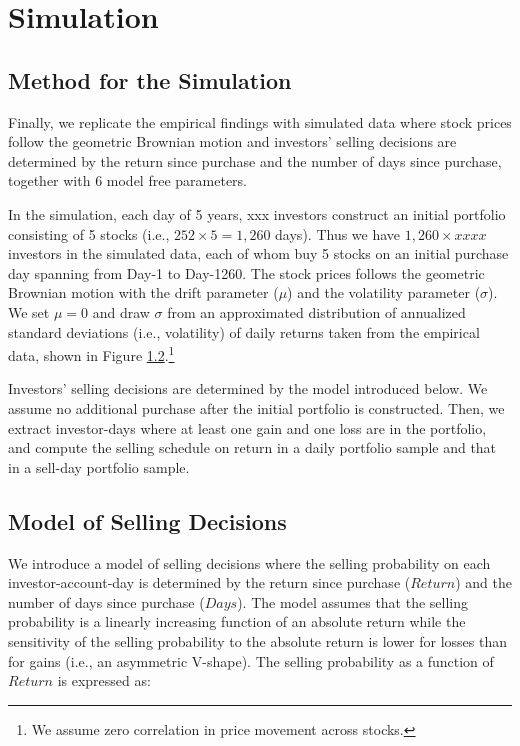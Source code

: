 \documentclass[11pt, a4paper]{article}
\begin{document}
\section{Simulation}

\subsection{Method for the Simulation}
Finally, we replicate the empirical findings with simulated data where stock prices follow the geometric Brownian motion and investors' selling decisions are determined by the return since purchase and the number of days since purchase, together with 6 model free parameters.

In the simulation, each day of 5 years, xxx investors construct an initial portfolio consisting of 5 stocks (i.e., $252\times5=1,260$ days). Thus we have $1,260\times xxxx$ investors in the simulated data, each of whom buy 5 stocks on an initial purchase day spanning from Day-1 to Day-1260. The stock prices follows the geometric Brownian motion with the drift parameter ($\mu$) and the volatility parameter ($\sigma$). We set $\mu=0$ and draw $\sigma$ from an approximated distribution of annualized standard deviations (i.e., volatility) of daily returns taken from the empirical data, shown in Figure \ref{}.\footnote{We assume zero correlation in price movement across stocks.}

Investors' selling decisions are determined by the model introduced below. We assume no additional purchase after the initial portfolio is constructed. Then, we extract investor-days where at least one gain and one loss are in the portfolio, and compute the selling schedule on return in a daily portfolio sample and that in a sell-day portfolio sample.


\subsection{Model of Selling Decisions}
We introduce a model of selling decisions where the selling probability on each investor-account-day is determined by the return since purchase ($Return$) and the number of days since purchase ($Days$). The model assumes that the selling probability is a linearly increasing function of an absolute return while the sensitivity of the selling probability to the absolute return is lower for losses than for gains (i.e., an asymmetric V-shape). The selling probability as a function of $Return$ is expressed as:\\
\end{document}
